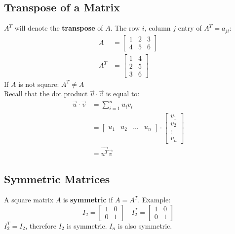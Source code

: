 \documentclass[letterpaper, 12pt]{math}
\begin{document}
\subsection*{Transpose of a Matrix}
\( A^T \) will denote the \textbf{transpose} of \( A \). The row \( i \),
column \( j \) entry of \( A^T = a_{ji} \):
\begin{align*}
  A &= \begin{bmatrix}1 & 2 & 3 \\ 4 & 5 & 6\end{bmatrix} \\
  A^T &= \begin{bmatrix}1 & 4 \\ 2 & 5 \\ 3 & 6\end{bmatrix}
\end{align*}
If \( A \) is not square: \( A^T \ne A \) \\
Recall that the dot product \( \vec{u}\cdot\vec{v} \) is equal to:
\begin{align*}
  \vec{u}\cdot\vec{v} &= \sum_{i=1}^{n}u_iv_i \\
  &= \begin{bmatrix}u_1 & u_2 & \dots & u_n\end{bmatrix}\cdot
    \begin{bmatrix}v_1 \\ v_2 \\ \vdots \\ v_n\end{bmatrix} \\
  &= \vec{u^T}\vec{v}
\end{align*}

\subsection*{Symmetric Matrices}
A square matrix \( A \) is \textbf{symmetric} if \( A = A^T \). Example:
\[ I_2 = \begin{bmatrix}1 & 0 \\ 0 & 1\end{bmatrix}\quad
  I_2^T = \begin{bmatrix}1 & 0 \\ 0 & 1\end{bmatrix} \]
\( I_2^T = I_2 \), therefore \( I_2 \) is symmetric. \( I_n \) is also
symmetric.
\end{document}

